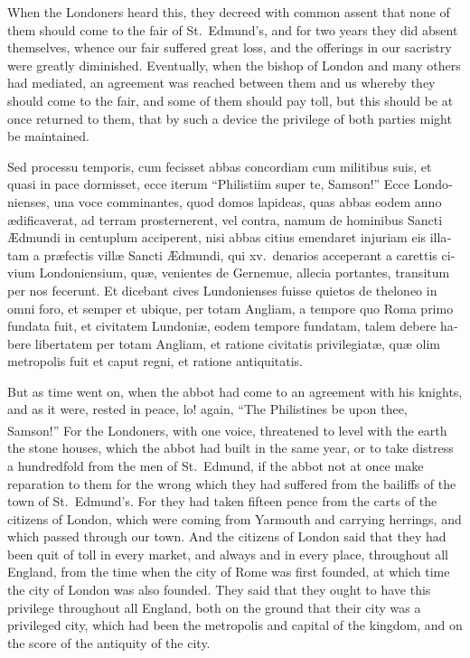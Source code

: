 \documentclass[10pt]{book}
\newcounter{engnote}
\newcommand{\engnotenum}{\textsuperscript{\arabic{engnote}\stepcounter{engnote}}}
\newcommand{\engnotetext}[1]{\vphantom{\footnotemark{}}\footnotetext{#1}}
\begin{document}
\begin{paracol}{2}
\switchcolumn

When the Londoners heard this, they decreed with common assent that none of them should come to the fair of St.\ Edmund's, and for two years they did absent themselves, whence our fair suffered great loss, and the offerings in our sacristry were greatly diminished. Eventually, when the bishop of London and many others had mediated, an agreement was reached between them and us whereby they should come to the fair, and some of them should pay toll, but this should be at once returned to them, that by such a device the privilege of both parties might be maintained.

\switchcolumn*

\begin{otherlanguage}{latin}
Sed processu temporis, cum fecisset abbas concordiam cum militibus suis, et quasi in pace dormisset, ecce iterum ``Philistiim super te, Samson!''\engnotetext{Jud.\ xvi., \oldstylenums{9}.} Ecce Londonienses, una voce comminantes, quod domos lapideas, quas abbas eodem anno \ae{}dificaverat, ad terram prosternerent, vel contra, namum de hominibus Sancti \AE{}dmundi in centuplum acciperent, nisi abbas citius emendaret injuriam eis illatam a pr\ae{}fectis vill\ae{} Sancti \AE{}dmundi, qui xv.\ denarios acceperant a carettis civium Londoniensium, qu\ae{}, venientes de Gernemue, allecia portantes, transitum per nos fecerunt. Et dicebant cives Lundonienses fuisse quietos de theloneo in omni foro, et semper et ubique, per totam Angliam, a tempore quo Roma primo fundata fuit, et civitatem Lundoni\ae{}, eodem tempore fundatam, talem debere habere libertatem per totam Angliam, et ratione civitatis privilegiat\ae{}, qu\ae{} olim metropolis fuit et caput regni, et ratione antiquitatis.
\end{otherlanguage}

\switchcolumn

But as time went on, when the abbot had come to an agreement with his knights, and as it were, rested in peace, lo! again, ``The Philistines be upon thee, Samson!''\engnotenum{} For the Londoners, with one voice, threatened to level with the earth the stone houses, which the abbot had built in the same year, or to take distress a hundredfold from the men of St.\ Edmund, if the abbot not at once make reparation to them for the wrong which they had suffered from the bailiffs of the town of St.\ Edmund's. For they had taken fifteen pence from the carts of the citizens of London, which were coming from Yarmouth and carrying herrings, and which passed through our town. And the citizens of London said that they had been quit of toll in every market, and always and in every place, throughout all England, from the time when the city of Rome was first founded, at which time the city of London was also founded. They said that they ought to have this privilege throughout all England, both on the ground that their city was a privileged city, which had been the metropolis and capital of the kingdom, and on the score of the antiquity of the city.


\end{paracol}
\end{document}
